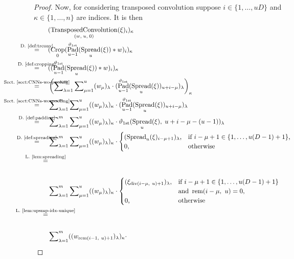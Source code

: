 \documentclass[journal]{IEEEtran}
\newcommand{\conv}{\ast}
\newcommand{\discint}[2]{\{#1,\dotsc,#2\}}
\newcommand{\inint}[2]{\in\discint{#1}{#2}}
\renewcommand{\div}[2]{\operatorname{div}(#1,\ #2)}
\newcommand{\rem}[2]{\operatorname{rem}(#1,\ #2)}
\newcommand{\equsing}[1]{\overset{\mathclap{\text{#1}}}{=}}
\DeclareMathOperator{\Padding}{Pad}
\DeclareMathOperator{\Cropping}{Crop}
\DeclareMathOperator{\Spreading}{Spread}
\DeclareMathOperator{\TransposedConvolution}{TransposedConvolution}
\newcommand{\Dirichlet}{1\text{st}}
\begin{document}
\begin{proof}
Now, for considering transposed convolution suppose $i\inint{1}{uD}$ and $\kappa\inint{1}{n}$ are indices.
It is then
\begin{align*}
  & (\TransposedConvolution_{(w,\; u,\; 0)}(\xi)_i)_\kappa\\
  \equsing{D.~\ref{def:trconv}}\ \ \ \ & (\Cropping_0( \Padding_{u - 1}^{\vartheta_{\Dirichlet}}( \Spreading_u(\xi)) \conv w)_i)_\kappa\\
  \equsing{D.~\ref{def:cropping}}\ \ \ \ & ((\Padding_{u - 1}^{\vartheta_{\Dirichlet}}( \Spreading_u(\xi)) \conv w)_i)_\kappa\\
  \equsing{Sect.~\ref{sect:CNNs-wo-pooling}}\ \ \ \ & \left(\sum\nolimits_{\lambda = 1}^m\sum\nolimits_{\mu = 1}^u (w_\mu)_\lambda \cdot (\Padding_{u - 1}^{\vartheta_{\Dirichlet}}( \Spreading_u(\xi))_{u + i - \mu})_\lambda\right)_\kappa\\
  \equsing{Sect.~\ref{sect:CNNs-wo-pooling}}\ \ \ \ & \sum\nolimits_{\lambda = 1}^m\sum\nolimits_{\mu = 1}^u ((w_\mu)_\lambda)_\kappa \cdot (\Padding_{u - 1}^{\vartheta_{\Dirichlet}}( \Spreading_u(\xi))_{u + i - \mu})_\lambda\\
  \equsing{D.~\ref{def:padding}}\ \ \ \ & \sum\nolimits_{\lambda = 1}^m\sum\nolimits_{\mu = 1}^u ((w_\mu)_\lambda)_\kappa \cdot \vartheta_{\Dirichlet}( \Spreading_u(\xi),\;u + i - \mu - (u - 1))_\lambda\\
  \equsing{D.~\ref{def:spreading}}\ \ \ \ & \sum\nolimits_{\lambda = 1}^m\sum\nolimits_{\mu = 1}^u ((w_\mu)_\lambda)_\kappa \cdot
      \begin{cases}
          (\Spreading_u(\xi)_{i - \mu + 1})_\lambda\text{,} & \text{if }i - \mu + 1\inint{1}{u(D - 1) + 1}\text{,}\\
          0\text{,} & \text{otherwise}
        \end{cases}\\
  \equsing{L.~\ref{lem:spreading}}\\\\& \sum\nolimits_{\lambda = 1}^m\sum\nolimits_{\mu = 1}^u ((w_\mu)_\lambda)_\kappa \cdot
      \begin{cases}
          (\xi_{\div{i - \mu}{u} + 1})_\lambda\text{,} & \text{if }i - \mu + 1\inint{1}{u(D - 1) + 1} \\& \text{and }\rem{i - \mu}{u} = 0\text{,}\\
          0\text{,} & \text{otherwise}
        \end{cases}\\
  \equsing{L.~\ref{lem:upsmp-idx-unique}}\\\\& \sum\nolimits_{\lambda = 1}^m ((w_{\rem{i - 1}{u} + 1})_\lambda)_\kappa \cdot

\end{align*}
\end{proof}
\end{document}
